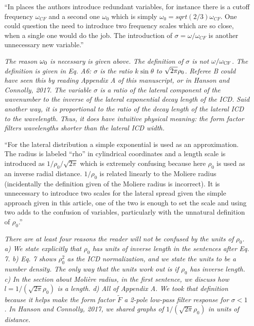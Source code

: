\documentclass[12pt]{article}
\begin{document}
``In places the authors introduce redundant variables, for instance there is a cutoff frequency $\omega_{CF}$ and a second one $\omega_0$ which is simply $\omega_0=sqrt(2/3) \omega_{CF}$. One could question the need to introduce two frequency scales which are so close, when a single one would do the job. The introduction of $\sigma = \omega/\omega_{CF}$ is another unnecessary new variable.''

\textit{The reason $\omega_{\rm 0}$ is necessary is given above.  The definition of $\sigma$ is not $\omega/\omega_{\rm CF}$.  The definition is given in Eq. A6: $\sigma$ is the ratio $k\sin\theta$ to $\sqrt{2 \pi}\rho_{\rm 0}$.  Referee B could have seen this by reading Appendix A of this manuscript, or in Hanson and Connolly, 2017.  The variable $\sigma$ is a ratio of the lateral component of the wavenumber to the inverse of the lateral exponential decay length of the ICD.  Said another way, it is proportional to the ratio of the decay length of the lateral ICD to the wavelength.  Thus, it does have intuitive physical meaning: the form factor filters wavelengths shorter than the lateral ICD width.}

``For the lateral distribution a simple exponential is used as an approximation. The radius is labeled ``rho'' in cylindrical coordinates and a length scale is introduced as $1/\rho_0/\sqrt{2 \pi}$ which is extremely confusing because here $\rho_0$ is used as an inverse radial distance. $1/\rho_0$ is related linearly to the Moliere radius (incidentally the definition given of the Moliere radius is incorrect). It is unnecessary to introduce two scales for the lateral spread given the simple approach given in this article, one of the two is enough to set the scale and using two adds to the confusion of variables, particularly with the unnatural definition of $\rho_0$.''

\textit{There are at least four reasons the reader will not be confused by the units of $\rho_{0}$.  a) We state explicitly that $\rho_0$ has units of inverse length in the sentences after Eq. 7.  b) Eq. 7 shows $\rho_0^2$ as the ICD normalization, and we state the units to be a number density.  The only way that the units work out is if $\rho_0$ has inverse length. c) In the section about Moli\`{e}re radius, in the first sentence, we discuss how $l = 1/(\sqrt{2\pi} \rho_0)$ is a length. d) All of Appendix A.  We took that definition because it helps make the form factor $\widetilde{F}$ a 2-pole low-pass filter response for $\sigma < 1$.  In Hanson and Connolly, 2017, we shared graphs of $1/(\sqrt{2\pi}\rho_0)$ in units of distance.}
\end{document}
